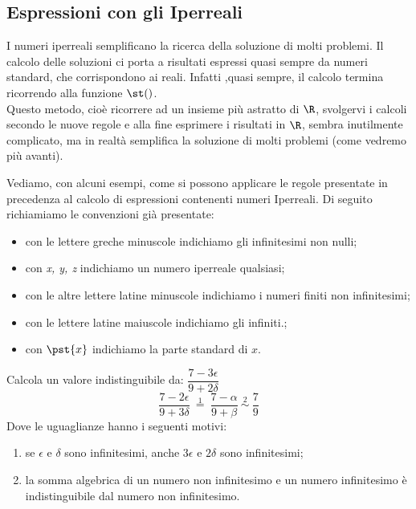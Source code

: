 \subsection{Espressioni con gli Iperreali}
\label{subsec:insnum_espressioni}

I numeri iperreali semplificano la ricerca della soluzione di molti 
problemi.
Il calcolo delle soluzioni ci porta a risultati espressi quasi sempre da 
numeri standard, che corrispondono ai reali. Infatti ,quasi sempre, il 
calcolo termina ricorrendo alla funzione \(\st()\).\\
Questo metodo, cioè ricorrere ad un insieme più astratto di \(\R\), 
svolgervi i calcoli secondo le nuove regole e alla fine esprimere i 
risultati in \(\R\), 
sembra inutilmente complicato, 
ma in realtà semplifica la soluzione di molti problemi 
(come vedremo più avanti).

Vediamo, con alcuni esempi, come si possono applicare 
le regole presentate in precedenza al calcolo di espressioni 
contenenti numeri Iperreali. 
Di seguito richiamiamo le convenzioni già presentate:
\begin{itemize} [nosep]
 \item con le lettere greche minuscole indichiamo gli infinitesimi non 
nulli;
 \item con \emph{x, y, z} indichiamo un numero iperreale qualsiasi;
 \item con le altre lettere latine minuscole indichiamo i numeri finiti non 
infinitesimi;
 \item con le lettere latine maiuscole indichiamo gli infiniti.;
 \item con \(\pst{x}\) indichiamo la parte standard di \(x\).
\end{itemize}

\begin{esempio}
Calcola un valore indistinguibile da:
\(\dfrac{7 -3 \epsilon}{9 +2 \delta}\)
\[\dfrac{7 -2 \epsilon}{9 +3 \delta} 
~ \stackrel{1}{=} ~
  \dfrac{7 -\alpha}{9 +\beta}
~ \stackrel{2}{\sim} ~ \dfrac{7}{9}\]
Dove le uguaglianze hanno i seguenti motivi:
\begin{enumerate} [nosep] 
 \item se \(\epsilon \text{ e } \delta\) sono infinitesimi, 
 anche \(3\epsilon\) e \(2 \delta\) sono infinitesimi;
 \item la somma algebrica di un numero non infinitesimo e un numero 
infinitesimo è indistinguibile dal numero non infinitesimo.
\end{enumerate}
\end{esempio}

